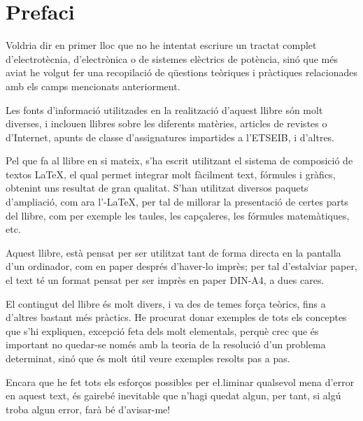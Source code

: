 \chapter*{Prefaci} 

   Voldria dir en primer lloc que no he intentat escriure un tractat complet
   d'electrot\`{e}cnia, d'electr\`{o}nica o de sistemes el\`{e}ctrics de pot\`{e}ncia, sin\'{o} que m\'{e}s aviat
   he volgut
   fer una recopilaci\'{o} de q\"{u}estions te\`{o}riques i pr\`{a}ctiques relacionades amb els camps mencionats
   anteriorment.

   Les fonts d'informaci\'{o} utilitzades en la realitzaci\'{o} d'aquest llibre s\'{o}n molt diverses,
   i inclouen llibres sobre les diferents mat\`{e}ries, articles de revistes o d'Internet,
   apunts de classe d'assignatures impartides a l'\textsf{ETSEIB}, i d'altres.

   Pel que fa al llibre en si mateix, s'ha escrit utilitzant el sistema de composici\'{o} de
   textos \LaTeX, el qual
   permet integrar molt f\`{a}cilment text, f\'{o}rmules i gr\`{a}fics, obtenint uns resultat de
   gran qualitat. S'han utilitzat diversos paquets d'ampliaci\'{o}, com ara
   l'\AmS-\LaTeX,
   per tal de millorar la presentaci\'{o} de certes parts del
   llibre, com per exemple les taules, les cap\c{c}aleres, les f\'{o}rmules matem\`{a}tiques, etc.

   Aquest llibre, est\`{a} pensat per ser utilitzat tant de forma directa en la pantalla d'un
   ordinador, com en paper despr\'{e}s d'haver-lo impr\`{e}s; per tal d'estalviar paper, el text
   t\'{e} un format pensat per ser impr\`{e}s en paper DIN-A4, a dues cares.

    El contingut del llibre \'{e}s molt divers, i va des de temes for\c{c}a te\`{o}rics, fins a
    d'altres bastant m\'{e}s pr\`{a}ctics. He procurat donar exemples de tots els conceptes
    que s'hi expliquen, excepci\'{o} feta dels molt elementals, perqu\`{e} crec que \'{e}s important
     no quedar-se nom\'{e}s amb la teoria de  la resoluci\'{o} d'un problema determinat, sin\'{o} que
     \'{e}s molt \'{u}til veure exemples resolts pas a pas.

    Encara que he fet tots els esfor\c{c}os possibles per e{\l.l}iminar qualsevol
    mena  d'error en aquest text, \'{e}s gaireb\'{e} inevitable que n'hagi quedat algun,
    per tant, si alg\'{u} troba algun error, far\`{a} b\'{e} d'avisar-me!


